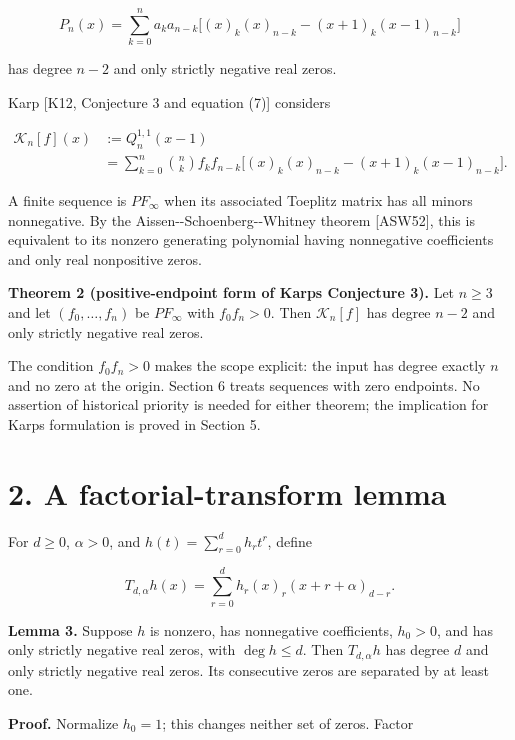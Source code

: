 \documentclass[11pt]{article}
\begin{document}
\[
P_n(x)=\sum_{k=0}^n a_ka_{n-k}
\bigl[(x)_k(x)_{n-k}-(x+1)_k(x-1)_{n-k}\bigr]
\tag{1}
\]

has degree \(n-2\) and only strictly negative real zeros.

Karp {[}K12, Conjecture 3 and equation (7){]} considers

\[
\begin{aligned}
\mathcal K_n[f](x)&:=Q_n^{1,1}(x-1)\\
&=\sum_{k=0}^n\binom nk f_kf_{n-k}
\bigl[(x)_k(x)_{n-k}-(x+1)_k(x-1)_{n-k}\bigr].
\end{aligned}
\tag{2}
\]

A finite sequence is \(PF_\infty\) when its associated Toeplitz matrix
has all minors nonnegative. By the Aissen-\/-Schoenberg-\/-Whitney
theorem {[}ASW52{]}, this is equivalent to its nonzero generating
polynomial having nonnegative coefficients and only real nonpositive
zeros.

\textbf{Theorem 2 (positive-endpoint form of Karp\textquotesingle s
Conjecture 3).} Let \(n\ge3\) and let \((f_0,\ldots,f_n)\) be
\(PF_\infty\) with \(f_0f_n>0\). Then \(\mathcal K_n[f]\) has degree
\(n-2\) and only strictly negative real zeros.

The condition \(f_0f_n>0\) makes the scope explicit: the input has
degree exactly \(n\) and no zero at the origin. Section 6 treats
sequences with zero endpoints. No assertion of historical priority is
needed for either theorem; the implication for Karp\textquotesingle s
formulation is proved in Section 5.

\section{2. A factorial-transform
lemma}\label{a-factorial-transform-lemma}

For \(d\ge0\), \(\alpha>0\), and \(h(t)=\sum_{r=0}^d h_rt^r\), define

\[
T_{d,\alpha}h(x)=\sum_{r=0}^d h_r(x)_r(x+r+\alpha)_{d-r}.
\tag{3}
\]

\textbf{Lemma 3.} Suppose \(h\) is nonzero, has nonnegative
coefficients, \(h_0>0\), and has only strictly negative real zeros, with
\(\deg h\le d\). Then \(T_{d,\alpha}h\) has degree \(d\) and only
strictly negative real zeros. Its consecutive zeros are separated by at
least one.

\textbf{Proof.} Normalize \(h_0=1\); this changes neither set of zeros.
Factor
\end{document}
